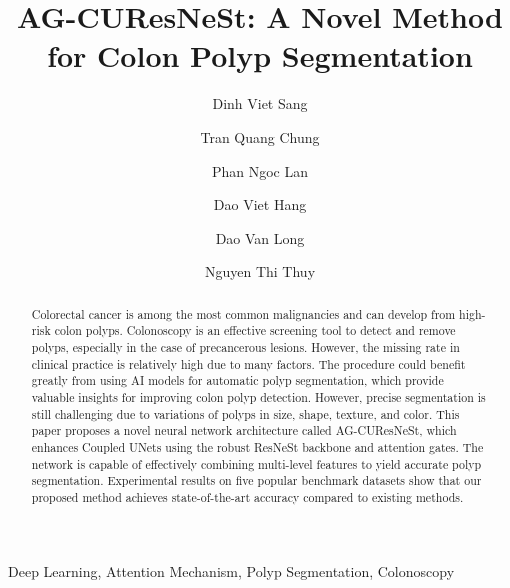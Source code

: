 \documentclass[review, sort&compress]{elsarticle}
\begin{document}
	
	\begin{frontmatter}
		
		\title{AG-CUResNeSt: A Novel Method for Colon Polyp Segmentation}
		
\author[dvs]{Dinh Viet Sang}
		
		\author[dvs]{Tran Quang Chung}
		
		\author[dvs]{Phan Ngoc Lan}
		
		\author[2,3]{Dao Viet Hang}
		
		\author[2,3]{Dao Van Long}
		
		\author[4]{Nguyen Thi Thuy}
		
		\address[dvs]{Hanoi University of Science and Technology, Hanoi, Vietnam}
		\address[2]{Hanoi Medical University, Hanoi, Vietnam}
		\address[3]{The Institute of Gastroenterology and Hepatology, Hanoi, Vietnam}
		\address[4]{Faculty of Information Technology, Vietnam National University of Agriculture, Hanoi, Vietnam}
		




		
		\newcommand*{\DrawBoundingBox}[1][]{\draw [red, very thick, #1]
			([shift={(-0pt,-0pt)}]current bounding box.south west)
			rectangle
			([shift={(0pt,+0pt)}]current bounding box.north east);
		}
		
		
		\begin{abstract}
			Colorectal cancer is among the most common malignancies and can develop from high-risk colon polyps. Colonoscopy is an effective screening tool to detect and remove polyps, especially in the case of precancerous lesions. However, the missing rate in clinical practice is relatively high due to many factors. The procedure could benefit greatly from using AI models for automatic polyp segmentation, which provide valuable insights for improving colon polyp detection. However, precise segmentation is still challenging due to variations of polyps in size, shape, texture, and color. This paper proposes a novel neural network architecture called AG-CUResNeSt, which enhances Coupled UNets using the robust ResNeSt backbone and attention gates. The network is capable of effectively combining multi-level features to yield accurate polyp segmentation. Experimental results on five popular benchmark datasets show that our proposed method achieves state-of-the-art accuracy compared to existing methods.
		\end{abstract}
		
		\begin{keyword}
			Deep Learning, Attention Mechanism, Polyp Segmentation, Colonoscopy
\end{keyword}
		
	\end{frontmatter}
	
\end{document}
